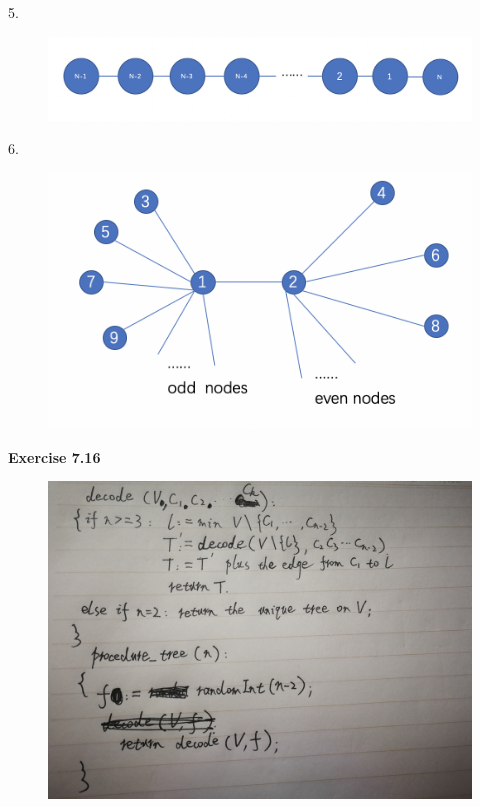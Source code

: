 \documentclass{article} %
\begin{document}
	5.\par
  	\begin{figure}[H]
  	\centering
  	\includegraphics[scale=0.6]{7.15.5.png}
  	\caption{}
  	\label{}
  	\end{figure}
	6.\par
  	\begin{figure}[H]
  	\centering
  	\includegraphics[scale=0.6]{7.15.6.png}
  	\caption{}
  	\label{}
  	\end{figure}
	\textbf{Exercise 7.16}\par
  	\begin{figure}[H]
  	\centering
  	\includegraphics[scale=0.1]{7.16.png}
  	\caption{}
  	\label{}
  	\end{figure}
\end{document}
